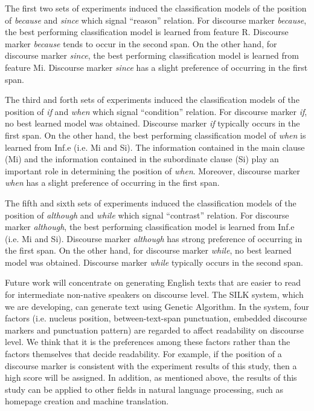 \documentclass[english]{jnlp_1.3e}
\begin{document}
The first two sets of experiments induced the classification models
of the position of \textit{because} and \textit{since} which signal 
``reason'' relation. For discourse marker \textit{because}, 
the best performing classification model is learned from feature R. 
Discourse marker \textit{because} tends to occur in the second 
span. On the other hand, for discourse marker \textit{since}, the best 
performing classification model is learned from feature Mi. Discourse 
marker \textit{since} has a slight preference of occurring in the first span.

The third and forth sets of experiments induced the classification models
of the position of \textit{if} and \textit{when} which signal 
``condition'' relation. For discourse marker \textit{if}, 
no best learned model was obtained. Discourse marker \textit{if} typically 
occurs in the first span. On the other hand, the best performing 
classification model of \textit{when} is learned from Inf.e (i.e. Mi and Si). 
The information contained in the main clause (Mi) and the information 
contained in the subordinate clause (Si) play an important role 
in determining the position of \textit{when}. Moreover, discourse marker 
\textit{when} has a slight preference of occurring in the first span.

The fifth and sixth sets of experiments induced the classification
models of the position of \textit{although} and \textit{while} which 
signal ``contrast'' relation. For discourse marker \textit{although}, 
the best performing classification model is learned from Inf.e (i.e. Mi and Si). 
Discourse marker \textit{although} has strong preference 
of occurring in the first span. On the other hand, for discourse marker 
\textit{while}, no best learned model was obtained. Discourse marker 
\textit{while} typically occurs in the second span.

Future work will concentrate on generating English texts that are
easier to read for intermediate non-native speakers on discourse
level. The SILK system, which we are developing, can generate text
using Genetic Algorithm. In the system, four factors
(i.e. nucleus position, between-text-span punctuation, embedded discourse
markers and punctuation pattern) are regarded to affect readability 
on discourse level. We think that it is the preferences among these 
factors rather than the factors themselves that decide readability. 
For example, if the position of a discourse marker is consistent with 
the experiment results of this study, then a high score will be assigned. 
In addition, as mentioned above, the results of this study can be 
applied to other fields in natural language processing, such as 
homepage creation and machine translation.
\end{document}
